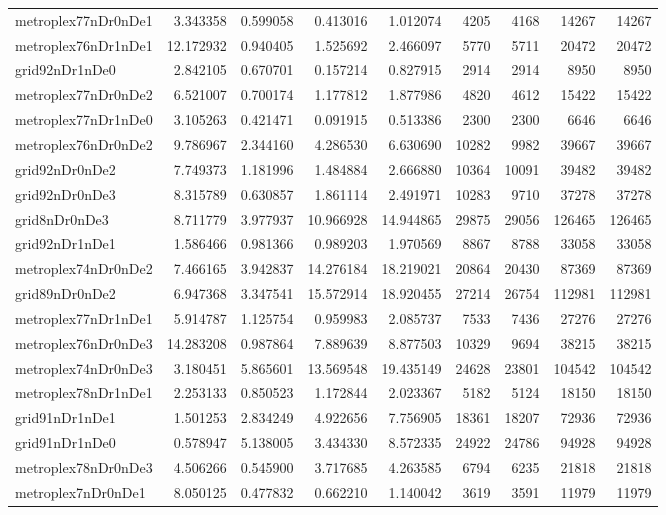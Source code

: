 \begin{longtable}{|l|r|r|r|r|r|r|r|r|}
metroplex77nDr0nDe1 & 3.343358 & 0.599058 & 0.413016 & 1.012074 & 4205 & 4168 & 14267 & 14267 \\
metroplex76nDr1nDe1 & 12.172932 & 0.940405 & 1.525692 & 2.466097 & 5770 & 5711 & 20472 & 20472 \\
grid92nDr1nDe0 & 2.842105 & 0.670701 & 0.157214 & 0.827915 & 2914 & 2914 & 8950 & 8950 \\
metroplex77nDr0nDe2 & 6.521007 & 0.700174 & 1.177812 & 1.877986 & 4820 & 4612 & 15422 & 15422 \\
metroplex77nDr1nDe0 & 3.105263 & 0.421471 & 0.091915 & 0.513386 & 2300 & 2300 & 6646 & 6646 \\
metroplex76nDr0nDe2 & 9.786967 & 2.344160 & 4.286530 & 6.630690 & 10282 & 9982 & 39667 & 39667 \\
grid92nDr0nDe2 & 7.749373 & 1.181996 & 1.484884 & 2.666880 & 10364 & 10091 & 39482 & 39482 \\
grid92nDr0nDe3 & 8.315789 & 0.630857 & 1.861114 & 2.491971 & 10283 & 9710 & 37278 & 37278 \\
grid8nDr0nDe3 & 8.711779 & 3.977937 & 10.966928 & 14.944865 & 29875 & 29056 & 126465 & 126465 \\
grid92nDr1nDe1 & 1.586466 & 0.981366 & 0.989203 & 1.970569 & 8867 & 8788 & 33058 & 33058 \\
metroplex74nDr0nDe2 & 7.466165 & 3.942837 & 14.276184 & 18.219021 & 20864 & 20430 & 87369 & 87369 \\
grid89nDr0nDe2 & 6.947368 & 3.347541 & 15.572914 & 18.920455 & 27214 & 26754 & 112981 & 112981 \\
metroplex77nDr1nDe1 & 5.914787 & 1.125754 & 0.959983 & 2.085737 & 7533 & 7436 & 27276 & 27276 \\
metroplex76nDr0nDe3 & 14.283208 & 0.987864 & 7.889639 & 8.877503 & 10329 & 9694 & 38215 & 38215 \\
metroplex74nDr0nDe3 & 3.180451 & 5.865601 & 13.569548 & 19.435149 & 24628 & 23801 & 104542 & 104542 \\
metroplex78nDr1nDe1 & 2.253133 & 0.850523 & 1.172844 & 2.023367 & 5182 & 5124 & 18150 & 18150 \\
grid91nDr1nDe1 & 1.501253 & 2.834249 & 4.922656 & 7.756905 & 18361 & 18207 & 72936 & 72936 \\
grid91nDr1nDe0 & 0.578947 & 5.138005 & 3.434330 & 8.572335 & 24922 & 24786 & 94928 & 94928 \\
metroplex78nDr0nDe3 & 4.506266 & 0.545900 & 3.717685 & 4.263585 & 6794 & 6235 & 21818 & 21818 \\
metroplex7nDr0nDe1 & 8.050125 & 0.477832 & 0.662210 & 1.140042 & 3619 & 3591 & 11979 & 11979 \\

\end{longtable}
